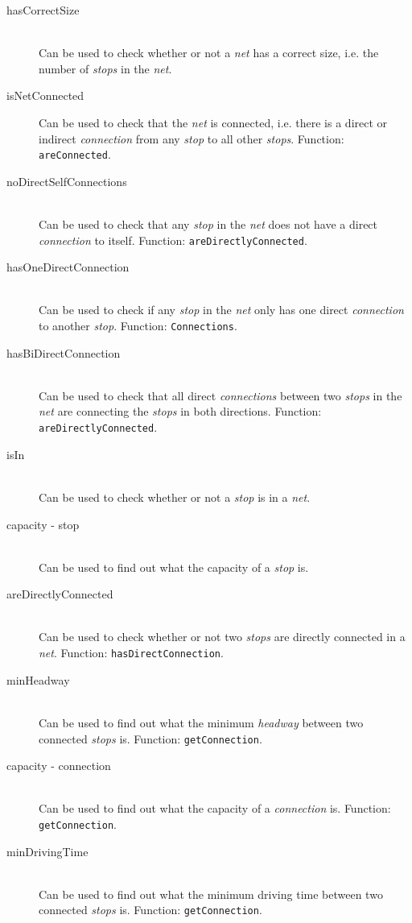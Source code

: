 \documentclass[a4]{article}
\begin{document}
\begin{description}
    \item[hasCorrectSize] \hfill \\ Can be used to check whether or not a \emph{net} has a correct size, i.e. the number of \emph{stops} in the \emph{net}.
    \item[isNetConnected] Can be used to check that the \emph{net} is connected, i.e. there is a direct or indirect \emph{connection} from any \emph{stop} to all other \emph{stops}. Function: \verb=areConnected=.
    \item[noDirectSelfConnections] \hfill \\ Can be used to check that any \emph{stop} in the \emph{net} does not have a direct \emph{connection} to itself. Function: \verb=areDirectlyConnected=.
    \item[hasOneDirectConnection] \hfill \\ Can be used to check if any \emph{stop} in the \emph{net} only has one direct \emph{connection} to another \emph{stop}. Function:  \verb=Connections=.
    \item[hasBiDirectConnection] \hfill \\ Can be used to check that all direct \emph{connections} between two \emph{stops} in the \emph{net} are connecting the \emph{stops} in both directions. Function: \verb=areDirectlyConnected=.
    \item[isIn] \hfill \\ Can be used to check whether or not a \emph{stop} is in a \emph{net}.
    \item[capacity - stop] \hfill \\ Can be used to find out what the capacity of a \emph{stop} is.
    \item[areDirectlyConnected] \hfill \\ Can be used to check whether or not two \emph{stops} are directly connected in a \emph{net}. Function: \verb=hasDirectConnection=.
    \item[minHeadway] \hfill \\ Can be used to find out what the minimum \emph{headway} between two connected \emph{stops} is. Function: \verb=getConnection=.
    \item[capacity - connection] \hfill \\ Can be used to find out what the capacity of a \emph{connection} is. Function: \verb=getConnection=.
    \item[minDrivingTime] \hfill \\ Can be used to find out what the minimum driving time between two connected \emph{stops} is. Function: \verb=getConnection=.

\end{description}
\end{document}
